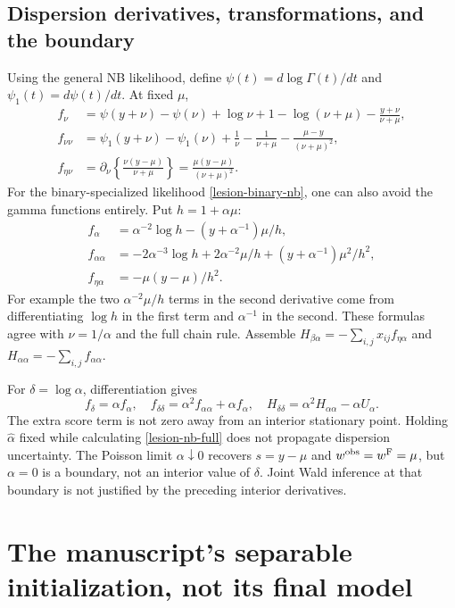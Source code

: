 \documentclass[11pt,a4paper]{article}
\numberwithin{equation}{section}
\begin{document}
\subsection{Dispersion derivatives, transformations, and the boundary}
Using the general NB likelihood, define
$\psi(t)=d\log\Gamma(t)/dt$ and $\psi_1(t)=d\psi(t)/dt$.
At fixed $\mu$,
\begin{align}
 f_\nu&=\psi(y+\nu)-\psi(\nu)+\log\nu+1-\log(\nu+\mu)
                                       -\frac{y+\nu}{\nu+\mu},\\
 f_{\nu\nu}&=\psi_1(y+\nu)-\psi_1(\nu)+\frac1\nu-\frac1{\nu+\mu}
                                       -\frac{\mu-y}{(\nu+\mu)^2},\\
 f_{\eta\nu}
 &=\partial_\nu\left\{\frac{\nu(y-\mu)}{\nu+\mu}\right\}
   =\frac{\mu(y-\mu)}{(\nu+\mu)^2}.
 \label{lesion-nuisance-r}
\end{align}
For the binary-specialized likelihood \eqref{lesion-binary-nb},
one can also avoid the gamma functions entirely. Put $h=1+\alpha\mu$:
\begin{align}
 f_\alpha
 &=\alpha^{-2}\log h-(y+\alpha^{-1})\mu/h,\\
 f_{\alpha\alpha}
 &=-2\alpha^{-3}\log h+2\alpha^{-2}\mu/h
                       +(y+\alpha^{-1})\mu^2/h^2,\\
 f_{\eta\alpha}&=-\mu(y-\mu)/h^2.
 \label{lesion-nuisance-alpha}
\end{align}
For example the two $\alpha^{-2}\mu/h$ terms in the second
derivative come from differentiating $\log h$ in the first term
and $\alpha^{-1}$ in the second.
These formulas agree with $\nu=1/\alpha$ and the full chain rule.
Assemble $H_{\beta\alpha}=-\sum_{i,j}x_{ij}f_{\eta\alpha}$
and $H_{\alpha\alpha}=-\sum_{i,j}f_{\alpha\alpha}$.

For $\delta=\log\alpha$, differentiation gives
\[
 f_\delta=\alpha f_\alpha,\quad
 f_{\delta\delta}=\alpha^2f_{\alpha\alpha}+\alpha f_\alpha,
 \quad H_{\delta\delta}
 =\alpha^2H_{\alpha\alpha}-\alpha U_\alpha.
\]
The extra score term is not zero away from an interior stationary point.
Holding $\widehat\alpha$ fixed while calculating
\eqref{lesion-nb-full} does not propagate dispersion uncertainty.
The Poisson limit $\alpha\downarrow0$ recovers $s=y-\mu$ and
$w^{\rm obs}=w^{\rm F}=\mu$, but $\alpha=0$ is a boundary,
not an interior value of $\delta$. Joint Wald inference at that
boundary is not justified by the preceding interior derivatives.

\section{The manuscript's separable initialization, not its final model}
\label{lesion-initialization}
\end{document}
